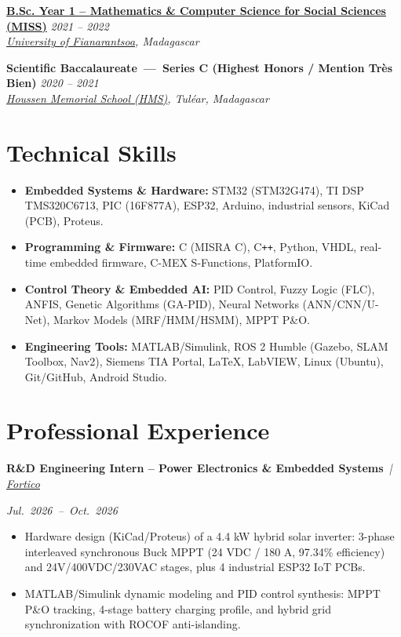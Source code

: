 \documentclass[10pt, a4paper]{article}
\newcommand{\cventry}[4]{%
    \noindent\textbf{#1} \hfill \textit{#2} \\
    \textit{#3} \hfill {\footnotesize #4} \vspace{0.2ex}
}
\newcommand{\experience}[3]{%
    \noindent
    \parbox[t]{0.72\textwidth}{\textbf{#1} \textit{\,|\,#2}}%
    \hfill
    \parbox[t]{0.26\textwidth}{\raggedleft\normalfont\itshape\mbox{#3}}%
    \par\vspace{0.2ex}
}
\begin{document}
\cventry{\href{https://facsciences.univ-fianarantsoa.mg/fr/formations/parcours/vorhf2gwn3pfzqta7w2pff6p}{B.Sc. Year 1 -- Mathematics \& Computer Science for Social Sciences (MISS)}}{2021 -- 2022}
{\href{https://www.univ-fianarantsoa.mg/}{University of Fianarantsoa}, Madagascar}{}
\vspace{0.6ex}

\cventry{\textcolor{primary}{Scientific Baccalaureate\ \textbf{---}\ Series C \textnormal{(Highest Honors / Mention Tr\`{e}s Bien)}}}{2020 -- 2021}
{\href{https://www.facebook.com/p/Coll\%C3\%A8ge-Priv\%C3\%A9-Houssen-Memorial-School-61557463046217/}{Houssen Memorial School (HMS)}, Tul\'{e}ar, Madagascar}{}

\section*{Technical Skills}
\begin{itemize}[leftmargin=*, itemsep=0.2ex, parsep=0pt]
	\item \textbf{Embedded Systems \& Hardware:} STM32 (STM32G474), TI DSP TMS320C6713, PIC (16F877A), ESP32, Arduino, industrial sensors, KiCad (PCB), Proteus.
	\item \textbf{Programming \& Firmware:} C (MISRA C), C\texttt{++}, Python, VHDL, real-time embedded firmware, C-MEX S-Functions, PlatformIO.
	\item \textbf{Control Theory \& Embedded AI:} PID Control, Fuzzy Logic (FLC), ANFIS, Genetic Algorithms (GA-PID), Neural Networks (ANN/CNN/U-Net), Markov Models (MRF/HMM/HSMM), MPPT P\&O.
	\item \textbf{Engineering Tools:} MATLAB/Simulink, ROS 2 Humble (Gazebo, SLAM Toolbox, Nav2), Siemens TIA Portal, LaTeX, LabVIEW, Linux (Ubuntu), Git/GitHub, Android Studio.
\end{itemize}

\section*{Professional Experience}

\experience{R\&D Engineering Intern -- Power Electronics \& Embedded Systems}{\href{https://sitewebfortico.vercel.app/fr}{Fortico}}{Jul. 2026 -- Oct. 2026}
\begin{itemize}
	\item Hardware design (KiCad/Proteus) of a 4.4 kW hybrid solar inverter: 3-phase interleaved synchronous Buck MPPT (24 VDC / 180 A, 97.34\% efficiency) and 24V/400VDC/230VAC stages, plus 4 industrial ESP32 IoT PCBs.
	\item MATLAB/Simulink dynamic modeling and PID control synthesis: MPPT P\&O tracking, 4-stage battery charging profile, and hybrid grid synchronization with ROCOF anti-islanding.
\end{itemize}
\end{document}
